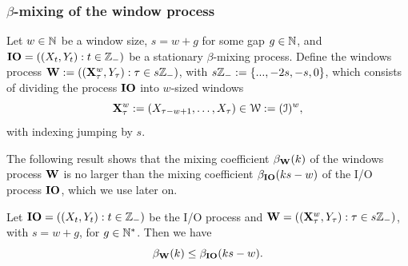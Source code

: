 \subsubsection{\texorpdfstring{$\beta$}{β}-mixing of the window process}\label{subsubsec:beta-mixing-window-process}
Let $w \in {\mathbb{N}}$ be a window size, $s = w + g$ for some gap $g \in {\mathbb{N}}$, and $\mathbf{IO} = ((X_t, Y_t): t \in {\mathbb{Z}}_-)$ be a stationary $\beta$-mixing process. Define the windows process ${\mathbf{W}} := \left(({\mathbf{X}}_\tau^w, Y_\tau): \tau \in s {\mathbb{Z}}_-\right)$, with $s{\mathbb{Z}}_- := \{..., -2s, -s, 0\}$, which consists of dividing the process $\mathbf{IO}$ into $w$-sized windows
\begin{equation*}
    {\mathbf{X}}_\tau^w := \left(X_{\tau - w + 1}, \ldots, X_\tau\right) \in {\mathcal{W}} := ({\mathcal{I}})^w,
\end{equation*}
with indexing jumping by $s$.

The following result shows that the mixing coefficient $\beta_{{\mathbf{W}}}(k)$ of the windows process ${\mathbf{W}}$ is no larger than the mixing coefficient $\beta_{\mathbf{IO}}(ks-w)$ of the I/O process $\mathbf{IO}$, which we use later on.
\begin{claim}\label{cl:beta-mixing-windows-process}
    Let $\mathbf{IO} = ((X_t, Y_t) : t \in {\mathbb{Z}}_-)$ be the I/O process and ${\mathbf{W}} = \left(({\mathbf{X}}^w_\tau, Y_\tau) : \tau \in s {\mathbb{Z}}_-\right)$, with $s = w + g$, for $g \in {\mathbb{N}}^\ast$. Then we have
    \begin{equation}
        \beta_{{\mathbf{W}}}(k) \leq \beta_{\mathbf{IO}}(k s - w).
    \end{equation}
\end{claim}

